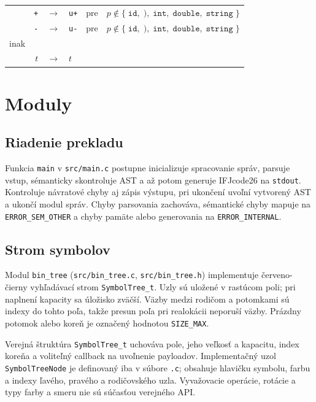 \documentclass[11pt,a4paper]{article}
\newcommand*\id[1]{\texttt{#1}}
\begin{document}
  \begin{table}[H]
    \centering
    \begin{tabular}{lrclll}
           & \id{+} & $\longrightarrow$ & \id{u+}    & pre & $p \notin \{\; \id{id},\; \id{)},\; \id{int},\; \id{double},\; \id{string}\; \}$ \\
           & \id{-} & $\longrightarrow$ & \id{u-}    & pre & $p \notin \{\; \id{id},\; \id{)},\; \id{int},\; \id{double},\; \id{string}\; \}$ \\
      inak &        &                   &            &     & \\
           & $t$    & $\longrightarrow$ & $t$        &     & \\
    \end{tabular}
  \end{table}

  \section{Moduly}
  \subsection{Riadenie prekladu}

  Funkcia \texttt{main} v \texttt{src/main.c} postupne inicializuje
  spracovanie správ, parsuje vstup, sémanticky skontroluje AST a až potom
  generuje IFJcode26 na \texttt{stdout}. Kontroluje návratové chyby aj zápis
  výstupu, pri ukončení uvoľní vytvorený AST a ukončí modul správ. Chyby
  parsovania zachováva, sémantické chyby mapuje na \texttt{ERROR\_SEM\_OTHER}
  a chyby pamäte alebo generovania na \texttt{ERROR\_INTERNAL}.

  \subsection{Strom symbolov}

  Modul \texttt{bin\_tree} (\texttt{src/bin\_tree.c},
  \texttt{src/bin\_tree.h}) implementuje červeno-čierny vyhľadávací strom
  \texttt{SymbolTree\_t}. Uzly sú uložené v rastúcom poli; pri naplnení
  kapacity sa úložisko zväčší. Väzby medzi rodičom a potomkami sú indexy do
  tohto poľa, takže presun poľa pri realokácii neporuší väzby. Prázdny
  potomok alebo koreň je označený hodnotou \texttt{SIZE\_MAX}.

  Verejná štruktúra \texttt{SymbolTree\_t} uchováva pole, jeho veľkosť a
  kapacitu, index koreňa a voliteľný callback na uvoľnenie payloadov.
  Implementačný uzol \texttt{SymbolTreeNode} je definovaný iba v súbore
  \texttt{.c}; obsahuje hlavičku symbolu, farbu a indexy ľavého, pravého a
  rodičovského uzla. Vyvažovacie operácie, rotácie a typy farby a smeru nie sú
  súčasťou verejného API.
\end{document}
